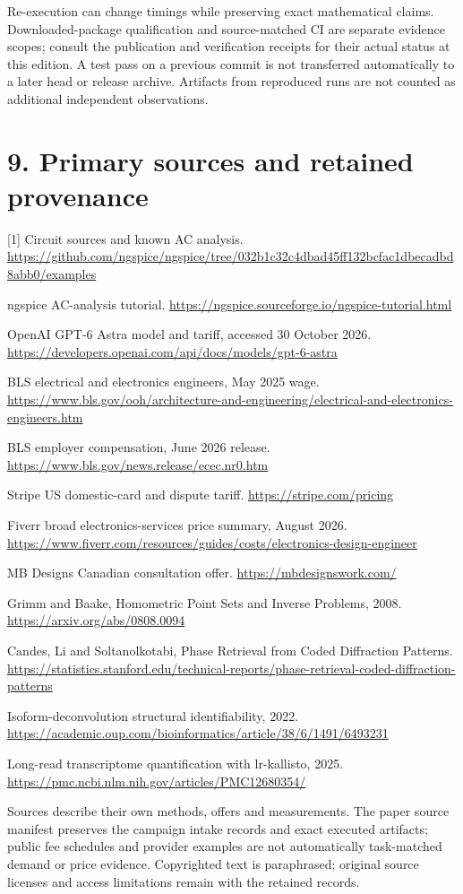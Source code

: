 \documentclass[10pt,letterpaper]{article}
\begin{document}
Re-execution can change timings while preserving exact mathematical claims. Downloaded-package qualification and source-matched CI are separate evidence scopes; consult the publication and verification receipts for their actual status at this edition. A test pass on a previous commit is not transferred automatically to a later head or release archive. Artifacts from reproduced runs are not counted as additional independent observations.\par
\section*{\color{accent}9. Primary sources and retained provenance}
[1] Circuit sources and known AC analysis. \url{https://github.com/ngspice/ngspice/tree/032b1c32c4dbad45ff132bcfac1dbecadbd8abb0/examples}\par
[2] ngspice AC-analysis tutorial. \url{https://ngspice.sourceforge.io/ngspice-tutorial.html}\par
[3] OpenAI GPT-6 Astra model and tariff, accessed 30 October 2026. \url{https://developers.openai.com/api/docs/models/gpt-6-astra}\par
[4] BLS electrical and electronics engineers, May 2025 wage. \url{https://www.bls.gov/ooh/architecture-and-engineering/electrical-and-electronics-engineers.htm}\par
[5] BLS employer compensation, June 2026 release. \url{https://www.bls.gov/news.release/ecec.nr0.htm}\par
[6] Stripe US domestic-card and dispute tariff. \url{https://stripe.com/pricing}\par
[7] Fiverr broad electronics-services price summary, August 2026. \url{https://www.fiverr.com/resources/guides/costs/electronics-design-engineer}\par
[8] MB Designs Canadian consultation offer. \url{https://mbdesignswork.com/}\par
[9] Grimm and Baake, Homometric Point Sets and Inverse Problems, 2008. \url{https://arxiv.org/abs/0808.0094}\par
[10] Candes, Li and Soltanolkotabi, Phase Retrieval from Coded Diffraction Patterns. \url{https://statistics.stanford.edu/technical-reports/phase-retrieval-coded-diffraction-patterns}\par
[11] Isoform-deconvolution structural identifiability, 2022. \url{https://academic.oup.com/bioinformatics/article/38/6/1491/6493231}\par
[12] Long-read transcriptome quantification with lr-kallisto, 2025. \url{https://pmc.ncbi.nlm.nih.gov/articles/PMC12680354/}\par
Sources describe their own methods, offers and measurements. The paper source manifest preserves the campaign intake records and exact executed artifacts; public fee schedules and provider examples are not automatically task-matched demand or price evidence. Copyrighted text is paraphrased; original source licenses and access limitations remain with the retained records.\par
\end{document}
